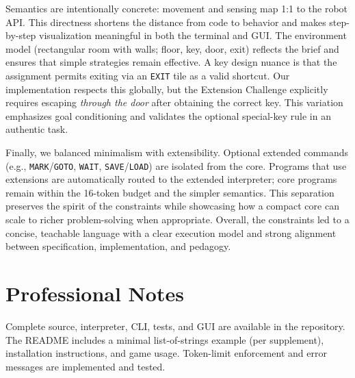 \documentclass[11pt,a4paper]{article}
\begin{document}
Semantics are intentionally concrete: movement and sensing map 1:1 to the robot API. This directness shortens the distance from code to behavior and makes step-by-step visualization meaningful in both the terminal and GUI. The environment model (rectangular room with walls; floor, key, door, exit) reflects the brief and ensures that simple strategies remain effective. A key design nuance is that the assignment permits exiting via an \texttt{EXIT} tile as a valid shortcut. Our implementation respects this globally, but the Extension Challenge explicitly requires escaping \emph{through the door} after obtaining the correct key. This variation emphasizes goal conditioning and validates the optional special-key rule in an authentic task.

Finally, we balanced minimalism with extensibility. Optional extended commands (e.g., \texttt{MARK}/\texttt{GOTO}, \texttt{WAIT}, \texttt{SAVE}/\texttt{LOAD}) are isolated from the core. Programs that use extensions are automatically routed to the extended interpreter; core programs remain within the 16-token budget and the simpler semantics. This separation preserves the spirit of the constraints while showcasing how a compact core can scale to richer problem-solving when appropriate. Overall, the constraints led to a concise, teachable language with a clear execution model and strong alignment between specification, implementation, and pedagogy.

\section*{Professional Notes}
Complete source, interpreter, CLI, tests, and GUI are available in the repository. The README includes a minimal list-of-strings example (per supplement), installation instructions, and game usage. Token-limit enforcement and error messages are implemented and tested.
\end{document}
